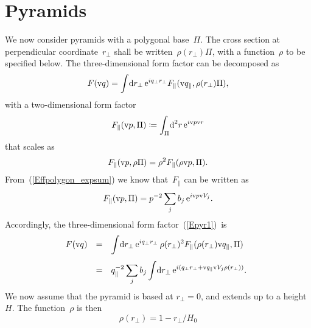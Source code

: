 %
%

\section{Pyramids}

%
%
%
%

We now consider pyramids with a polygonal base~$\Pi$.
The cross section at perpendicular coordinate~$r_\perp$
shall be written~$\rho(r_\perp)\Pi$,
with a function~$\rho$ to be specified below.
The three-dimensional form factor can be decomposed as
\begin{equation}\label{Epyr1}
  F(\text{v}{q})
  = \int\!\text{d} r_\perp\,\text{e}^{iq_\perp r_\perp} F_\parallel(\text{v}{q}_\parallel,\rho(r_\perp)\Pi),
\end{equation}
with a two-dimensional form factor
\begin{equation}
  F_\parallel(\text{v}{p},\Pi) \coloneqq \int_\Pi\!\text{d}^2r\,\text{e}^{i\text{v}{p}\text{v}{r}}
\end{equation}
that scales as
\begin{equation}
  F_\parallel(\text{v}{p},\rho\Pi) = \rho^2 F_\parallel(\rho\text{v}{p},\Pi).
\end{equation}
From~(\ref{Effpolygon_expsum}) we know that~$F_\parallel$ can be written as
\begin{equation}
  F_\parallel(\text{v}{p},\Pi)=p^{-2}\sum_j b_j\, \text{e}^{i\text{v}{p} \text{v}{V}_j}.
\end{equation}
Accordingly, the three-dimen\-sional form factor~(\ref{Epyr1})~is
\begin{equation}
  \begin{array}{@{}lcl}
  F(\q)
  &=& \displaystyle
       \int\!\d r_\perp\,\e^{iq_\perp r_\perp}\,\rho(r_\perp)^2 F_\parallel(\rho(r_\perp)\q_\parallel,\Pi)
\\[3ex]
  &=& \displaystyle
      q_\parallel^{-2}  \sum_j b_j
      \int\!\d r_\perp\,\e^{i(q_\perp r_\perp+\q_\parallel \V_j\rho(r_\perp))}.
  \end{array}
\end{equation}
We now assume that the pyramid is based at $r_\perp=0$,
and extends up to a height~$H$.
The function~$\rho$ is then
\begin{equation}
  \rho(r_\perp) = 1-r_\perp/H_0
\end{equation}
